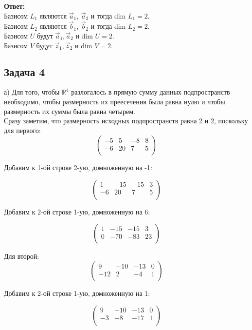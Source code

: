	\textbf{Ответ:\\} Базисом $L_1$ являются $\vec a_1,\ \vec a_2$ и тогда dim $L_1 = 2$. \\
	Базисом $L_2$ являются $\vec b_1,\ \vec b_2$ и тогда dim $L_2 = 2$. \\
	Базисом $U$ будут $\vec a_1, \vec a_2$ и dim $U = 2$.\\
	Базисом $V$ будут $\vec z_1, \vec z_2$ и dim $V = 2$.
	
	
	\subsection{Задача 4} 
	а) Для того, чтобы $\mathbb{R}^4$ разлогалось в прямую сумму данных подпространств необходимо, чтобы размерность их преесечения была равна нулю и чтобы размерность их суммы была равна четырем. \\
	Сразу заметим, что размерность исходных подпространств равна 2 и 2, поскольку для первого:
	\[
	\begin{pmatrix}
	-5 & 5 & -8 & 8 \\
	-6 & 20 & 7 & 5 \\
	\end{pmatrix}
	\]
	
	Добавим к 1-ой строке 2-ую, домноженную на -1:
	
	\[
	\begin{pmatrix}
	1 & -15 & -15 & 3 \\
	-6 & 20 & 7 & 5 \\
	\end{pmatrix}
	\]
	
	Добавим к 2-ой строке 1-ую, домноженную на 6:
	
	\[
	\begin{pmatrix}
	1 & -15 & -15 & 3 \\
	0 & -70 & -83 & 23 \\
	\end{pmatrix}
	\]
	
	Для второй: \\
	\[
	\begin{pmatrix}
	9 & -10 & -13 & 0 \\
	-12 & 2 & -4 & 1 \\
	\end{pmatrix}
	\]
	
	Добавим к 2-ой строке 1-ую, домноженную на 1:
	
	\[
	\begin{pmatrix}
	9 & -10 & -13 & 0 \\
	-3 & -8 & -17 & 1 \\
	\end{pmatrix}
	\]
	
